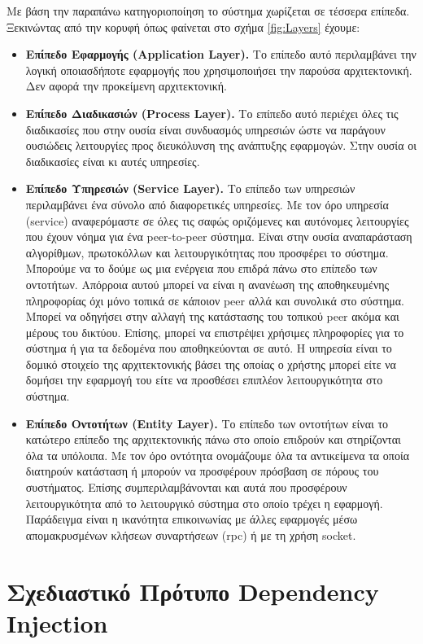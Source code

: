 Με βάση την παραπάνω κατηγοριοποίηση το σύστημα χωρίζεται σε τέσσερα 
επίπεδα. Ξεκινώντας από την κορυφή όπως φαίνεται στο σχήμα 
\ref{fig:Layers} έχουμε:

\begin{itemize}
\item \textbf{Επίπεδο Εφαρμογής (Application Layer).} Το επίπεδο αυτό 
περιλαμβάνει την λογική οποιασδήποτε εφαρμογής που χρησιμοποιήσει την 
παρούσα αρχιτεκτονική. Δεν αφορά την προκείμενη αρχιτεκτονική.
\item \textbf{Επίπεδο Διαδικασιών (Process Layer).} Το επίπεδο αυτό 
περιέχει όλες τις διαδικασίες που στην ουσία είναι συνδυασμός υπηρεσιών 
ώστε να παράγουν ουσιώδεις λειτουργίες προς διευκόλυνση της ανάπτυξης 
εφαρμογών. Στην ουσία οι διαδικασίες είναι κι αυτές υπηρεσίες.
\item \textbf{Επίπεδο Υπηρεσιών (Service Layer).} Το επίπεδο των 
υπηρεσιών περιλαμβάνει ένα σύνολο από διαφορετικές υπηρεσίες. Με τον όρο 
υπηρεσία (service) αναφερόμαστε σε όλες τις σαφώς οριζόμενες και 
αυτόνομες λειτουργίες που έχουν νόημα για ένα peer-to-peer σύστημα. 
Είναι στην ουσία αναπαράσταση αλγορίθμων, πρωτοκόλλων και 
λειτουργικότητας που προσφέρει το σύστημα. Μπορούμε να το δούμε ως μια 
ενέργεια που επιδρά πάνω στο επίπεδο των οντοτήτων. Απόρροια αυτού 
μπορεί να είναι η ανανέωση της αποθηκευμένης πληροφορίας όχι μόνο τοπικά 
σε κάποιον peer αλλά και συνολικά στο σύστημα. Μπορεί να οδηγήσει στην 
αλλαγή της κατάστασης του τοπικού peer ακόμα και μέρους του δικτύου. 
Επίσης, μπορεί να επιστρέψει χρήσιμες πληροφορίες για το σύστημα ή για 
τα δεδομένα που αποθηκεύονται σε αυτό. Η υπηρεσία είναι το δομικό 
στοιχείο της αρχιτεκτονικής βάσει της οποίας ο χρήστης μπορεί είτε να 
δομήσει την εφαρμογή του είτε να προσθέσει επιπλέον λειτουργικότητα στο 
σύστημα.
\item \textbf{Επίπεδο Οντοτήτων (Entity Layer).} Το επίπεδο των 
οντοτήτων είναι το κατώτερο επίπεδο της αρχιτεκτονικής πάνω στο οποίο 
επιδρούν και στηρίζονται όλα τα υπόλοιπα. Με τον όρο οντότητα ονομάζουμε 
όλα τα αντικείμενα τα οποία διατηρούν κατάσταση ή μπορούν να προσφέρουν 
πρόσβαση σε πόρους του συστήματος. Επίσης συμπεριλαμβάνονται και αυτά 
που προσφέρουν λειτουργικότητα από το λειτουργικό σύστημα στο οποίο 
τρέχει η εφαρμογή. Παράδειγμα είναι η ικανότητα επικοινωνίας με άλλες 
εφαρμογές μέσω απομακρυσμένων κλήσεων συναρτήσεων (rpc) ή με τη χρήση 
socket.
\end{itemize}

\section{Σχεδιαστικό Πρότυπο Dependency Injection}

